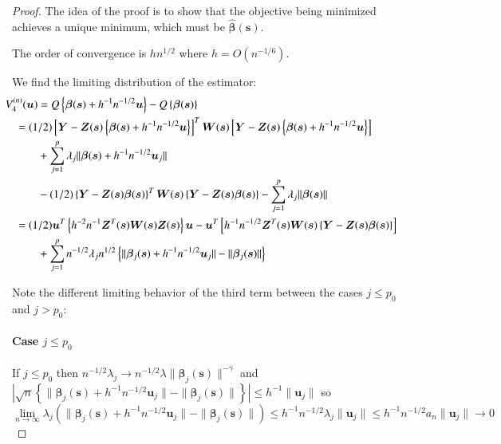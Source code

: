 \documentclass[authoryear, review, 11pt]{elsarticle}
\begin{document}
    \begin{proof}
        The idea of the proof is to show that the objective being minimized achieves a unique minimum, which must be $\hat{\bm{\beta}}(\bm{s})$.
    
        The order of convergence is $h n^{1/2}$ where $h = O(n^{-1/6})$.
    
        We find the limiting distribution of the estimator:
        \begin{align}\label{eq:consistency}
            \mkern-36mu V_4^{(n)}(\bm{u}) &= Q \left\{ \bm{\beta} (\bm{s}) + h^{-1} n^{-1/2} \bm{u} \right\} - Q \left\{ \bm{\beta}(\bm{s}) \right\} \notag \\
            &\mkern-36mu= (1/2) \left[ \bm{Y} - \bm{Z}(\bm{s}) \left\{ \bm{\beta}(\bm{s}) + h^{-1} n^{-1/2} \bm{u} \right\} \right]^T \bm{W}(\bm{s}) \left[ \bm{Y} - \bm{Z}(\bm{s}) \left\{ \bm{\beta}(\bm{s}) + h^{-1} n^{-1/2} \bm{u} \right\} \right] \notag \\
            &+ \sum_{j=1}^p \lambda_j \| \bm{\beta}(\bm{s}) + h^{-1} n^{-1/2} \bm{u}_j \| \notag \\
            &- (1/2) \left\{ \bm{Y} - \bm{Z}(\bm{s}) \bm{\beta}(\bm{s}) \right\}^T \bm{W}(\bm{s}) \left\{ \bm{Y} - \bm{Z}(\bm{s}) \bm{\beta}(\bm{s}) \right\} - \sum_{j=1}^p \lambda_j \| \bm{\beta}(\bm{s}) \| \notag \\ 
            &\mkern-36mu= (1/2) \bm{u}^T \left\{ h^{-2} n^{-1} \bm{Z}^T(\bm{s}) \bm{W}(\bm{s}) \bm{Z}(\bm{s}) \right\} \bm{u} - \bm{u}^T \left[ h^{-1} n^{-1/2} \bm{Z}^T(\bm{s}) \bm{W}(\bm{s}) \left\{ \bm{Y} - \bm{Z}(\bm{s}) \bm{\beta}(\bm{s}) \right\} \right] \notag \\
            &+ \sum_{j=1}^p n^{-1/2} \lambda_j n^{1/2} \left\{ \|\bm{\beta}_j(\bm{s}) + h^{-1} n^{-1/2} \bm{u}_j \| - \| \bm{\beta}_j(\bm{s}) \| \right\}
        \end{align}
        
        Note the different limiting behavior of the third term between the cases $j \le p_0$ and $j > p_0$:
        
        \paragraph{Case $j \le p_0$}
        If $j \le p_0$ then $n^{-1/2} \lambda_j \to n^{-1/2} \lambda \| \bm{\beta}_j(\bm{s}) \|^{-\gamma}$ and $| \sqrt{n} \left\{ \|\bm{\beta}_j(\bm{s}) + h^{-1} n^{-1/2} \bm{u}_j \| - \| \bm{\beta}_j(\bm{s}) \| \right\} | \le h^{-1} \| \bm{u}_j \|$ so $\lim \limits_{n \to \infty} \lambda_j \left( \|\bm{\beta}_j(\bm{s}) + h^{-1} n^{-1/2} \bm{u}_j \| - \| \bm{\beta}_j(\bm{s}) \| \right) \le h^{-1} n^{-1/2} \lambda_j  \| \bm{u}_j \| \le h^{-1} n^{-1/2} a_n \| \bm{u}_j \| \to 0$


\end{proof}
\end{document}

